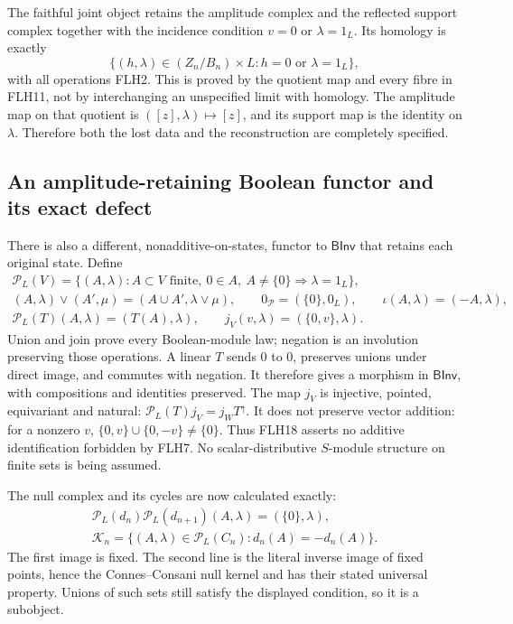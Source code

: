 The faithful joint object retains the amplitude complex and
the reflected support complex together with the incidence
condition \(v=0\) or \(\lambda=1_L\). Its homology is exactly
\[
\{(h,\lambda)\in (Z_n/B_n)\times L:
                      h=0\text{ or }\lambda=1_L\},
\tag{FLH17}
\]
with all operations FLH2. This is proved by the quotient map
and every fibre in FLH11, not by interchanging an unspecified
limit with homology. The amplitude map on that quotient is
\(([z],\lambda)\mapsto[z]\), and its support map is the
identity on \(\lambda\). Therefore both the lost data and the
reconstruction are completely specified.

\subsection{An amplitude-retaining Boolean functor and its exact defect}

There is also a different, nonadditive-on-states, functor to
\(\mathsf{BInv}\) that retains each original state. Define
\[
\begin{gathered}
\mathcal P_L(V)=
\{(A,\lambda): A\subset V\text{ finite},\ 0\in A,\
                     A\ne\{0\}\Rightarrow\lambda=1_L\},\\
(A,\lambda)\vee(A',\mu)=(A\cup A',\lambda\vee\mu),\qquad
0_{\mathcal P}=(\{0\},0_L),\qquad
\iota(A,\lambda)=(-A,\lambda),\\
\mathcal P_L(T)(A,\lambda)=(T(A),\lambda),\qquad
j_V(v,\lambda)=(\{0,v\},\lambda).
\end{gathered}\tag{FLH18}
\]
Union and join prove every Boolean-module law; negation is
an involution preserving those operations. A linear \(T\)
sends \(0\) to \(0\), preserves unions under direct image,
and commutes with negation. It therefore gives a morphism in
\(\mathsf{BInv}\), with compositions and identities preserved.
The map \(j_V\) is injective, pointed, equivariant and natural:
\(\mathcal P_L(T)j_V=j_WT^\uparrow\). It does not preserve
vector addition: for a nonzero \(v\),
\(\{0,v\}\cup\{0,-v\}\ne\{0\}\).
Thus FLH18 asserts no additive identification forbidden by FLH7.
No scalar-distributive \(S\)-module structure on finite sets
is being assumed.

The null complex and its cycles are now calculated exactly:
\[
\begin{gathered}
\mathcal P_L(d_n)\mathcal P_L(d_{n+1})(A,\lambda)
   =(\{0\},\lambda),\\
\mathcal K_n=
\{(A,\lambda)\in\mathcal P_L(C_n):
                              d_n(A)=-d_n(A)\}.
\end{gathered}\tag{FLH19}
\]
The first image is fixed. The second line is the literal
inverse image of fixed points, hence the Connes--Consani
null kernel and has their stated universal property.
Unions of such sets still satisfy the displayed condition,
so it is a subobject.

